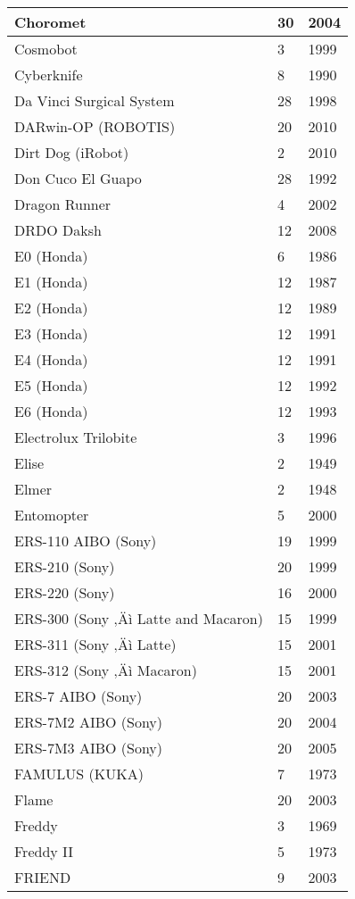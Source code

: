 \begin{longtable}{l | l | l }
Choromet	&	30	&	2004	\\	\hline
Cosmobot	&	3	&	1999	\\	\hline
Cyberknife	&	8	&	1990	\\	\hline
Da Vinci Surgical System \cite{robotdavinci}	&	28	&	1998	\\	\hline
DARwin-OP (ROBOTIS)	&	20	&	2010	\\	\hline
Dirt Dog (iRobot)	&	2	&	2010	\\	\hline
Don Cuco El Guapo	&	28	&	1992	\\	\hline
Dragon Runner	&	4	&	2002	\\	\hline
DRDO Daksh	&	12	&	2008	\\	\hline
E0 (Honda)	&	6	&	1986	\\	\hline
E1 (Honda)	&	12	&	1987	\\	\hline
E2 (Honda)	&	12	&	1989	\\	\hline
E3 (Honda)	&	12	&	1991	\\	\hline
E4 (Honda)	&	12	&	1991	\\	\hline
E5 (Honda) 	&	12	&	1992	\\	\hline
E6 (Honda)	&	12	&	1993	\\	\hline
Electrolux Trilobite	&	3	&	1996	\\	\hline
Elise \cite{robotElmer}	&	2	&	1949	\\	\hline
Elmer \cite{robotElmer} &	2	&	1948	\\	\hline
Entomopter	&	5	&	2000	\\	\hline
ERS-110 AIBO (Sony)	&	19	&	1999	\\	\hline
ERS-210 (Sony)	&	20	&	1999	\\	\hline
ERS-220 (Sony)	&	16	&	2000	\\	\hline
ERS-300 (Sony ‚Äì Latte and Macaron)	&	15	&	1999	\\	\hline
ERS-311 (Sony ‚Äì Latte)	&	15	&	2001	\\	\hline
ERS-312 (Sony ‚Äì Macaron)	&	15	&	2001	\\	\hline
ERS-7 AIBO (Sony)	&	20	&	2003	\\	\hline
ERS-7M2 AIBO (Sony)	&	20	&	2004	\\	\hline
ERS-7M3 AIBO (Sony)	&	20	&	2005	\\	\hline
FAMULUS (KUKA)	&	7	&	1973	\\	\hline
Flame	&	20	&	2003	\\	\hline
Freddy	&	3	&	1969	\\	\hline
Freddy II	&	5	&	1973	\\	\hline
FRIEND	&	9	&	2003	\\	\hline

\end{longtable}
